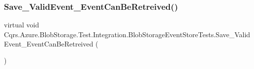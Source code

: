 \subsubsection{\texorpdfstring{Save\+\_\+\+Valid\+Event\+\_\+\+Event\+Can\+Be\+Retreived()}{Save\_ValidEvent\_EventCanBeRetreived()}}
{\footnotesize\ttfamily virtual void Cqrs.\+Azure.\+Blob\+Storage.\+Test.\+Integration.\+Blob\+Storage\+Event\+Store\+Tests.\+Save\+\_\+\+Valid\+Event\+\_\+\+Event\+Can\+Be\+Retreived (\begin{DoxyParamCaption}{ }\end{DoxyParamCaption})\hspace{0.3cm}{\ttfamily [virtual]}}

